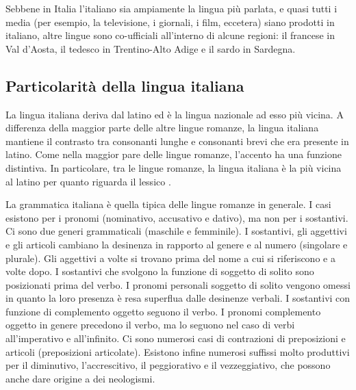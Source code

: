 \documentclass[]{../../metanetpaper}
\begin{document}
\begin{multicols}{2}
Sebbene in Italia l'italiano sia ampiamente la lingua pi\`{u} parlata, e quasi
tutti i media (per esempio, la televisione, i giornali, i film, eccetera)
siano prodotti in italiano, altre lingue sono co-ufficiali all'interno di
alcune regioni: il francese in Val d'Aosta, il tedesco in Trentino-Alto Adige
e il sardo in Sardegna.



\subsection{Particolarit\`{a} della lingua italiana}

La lingua italiana deriva dal latino ed \`{e} la lingua nazionale ad esso
pi\`{u} vicina. A differenza della maggior parte delle altre lingue romanze,
la lingua italiana mantiene il contrasto tra consonanti lunghe e consonanti
brevi che era presente in latino. Come nella maggior pare delle lingue
romanze, l'accento ha una funzione distintiva. In particolare, tra le lingue
romanze, la lingua italiana \`{e} la pi\`{u} vicina al latino per quanto
riguarda il lessico \cite{ethnologue}.

La grammatica italiana \`{e} quella tipica delle lingue romanze in generale. I
casi esistono per i pronomi (nominativo, accusativo e dativo), ma non per i
sostantivi. Ci sono due generi grammaticali (maschile e femminile). I
sostantivi, gli aggettivi e gli articoli cambiano la desinenza in rapporto al
genere e al numero (singolare e plurale). Gli aggettivi a volte si trovano
prima del nome a cui si riferiscono e a volte dopo. I sostantivi che svolgono
la funzione di soggetto di solito sono posizionati prima del verbo. I pronomi
personali soggetto di solito vengono omessi in quanto la loro presenza \`{e}
resa superflua dalle desinenze verbali. I sostantivi con funzione di
complemento oggetto seguono il verbo. I pronomi complemento oggetto in genere
precedono il verbo, ma lo seguono nel caso di verbi all'imperativo e
all'infinito. Ci sono numerosi casi di contrazioni di preposizioni e articoli
(preposizioni articolate). Esistono infine numerosi suffissi molto produttivi
per il diminutivo, l'accrescitivo, il peggiorativo e il vezzeggiativo, che
possono anche dare origine a dei neologismi.





\end{multicols}
\end{document}
